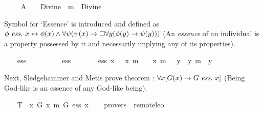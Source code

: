 \begin{isabellebody}
\begin{isamarkuptext}
\end{isamarkuptext}%
\isamarkuptrue%
\ \ \isamarkupfalse%
\ \ A{}{\isacharcolon}\ \ {\isachardoublequoteopen}{\isacharbrackleft}{\isasymPi}\ {\isacharparenleft}{\isasymlambda}{\isasymPhi}{\isachardot}\ Divine\ {\isasymPhi}\ m{\isasymRightarrow}\ {\isasymbox}\ {\isacharparenleft}Divine\ {\isasymPhi}{\isacharparenright}{\isacharparenright}{\isacharbrackright}{\isachardoublequoteclose}%
\begin{isamarkuptext}%
Symbol  for `Essence' is introduced and defined as 
$\phi \ \mathit{ess.} \ x \leftrightarrow \phi(x) \wedge \forall \psi (\psi(x) \rightarrow \Box \forall y (\phi(y) 
\rightarrow \psi(y)))$ (An \emph{essence} of an individual is a property possessed by it 
and necessarily implying any of its properties).%
\end{isamarkuptext}%
\isamarkuptrue%
\ \ \isamarkupfalse%
\ ess\ {\isacharcolon}{\isacharcolon}\ {\isachardoublequoteopen}{\isacharparenleft}{\isasymmu}\ {\isasymRightarrow}\ {\isasymsigma}{\isacharparenright}\ {\isasymRightarrow}\ {\isasymmu}\ {\isasymRightarrow}\ {\isasymsigma}{\isachardoublequoteclose}\ {\isacharparenleft}\ {\isachardoublequoteopen}ess{\isachardoublequoteclose}\ {}{}{\isacharparenright}\ \isanewline
\ \ \ \ {\isachardoublequoteopen}{\isasymPhi}\ ess\ x\ {\isacharequal}\ {\isasymPhi}\ x\ m{\isasymand}\ {\isasymPi}\ {\isacharparenleft}{\isasymlambda}{\isasympsi}{\isachardot}\ {\isasympsi}\ x\ m{\isasymRightarrow}\ {\isasymbox}\ {\isacharparenleft}{\isasymforall}\ {\isacharparenleft}{\isasymlambda}y{\isachardot}\ {\isasymPhi}\ y\ m{\isasymRightarrow}\ {\isasympsi}\ y{\isacharparenright}{\isacharparenright}{\isacharparenright}{\isachardoublequoteclose}%
\begin{isamarkuptext}%
Next, Sledgehammer and Metis prove theorem : $\forall x [G(x) \rightarrow G \ \mathit{ess.} \ x]$ 
(Being God-like is an essence of any God-like being).%
\end{isamarkuptext}%
\isamarkuptrue%
\ \ \isamarkupfalse%
\ T{}{\isacharcolon}\ {\isachardoublequoteopen}{\isacharbrackleft}{\isasymforall}\ {\isacharparenleft}{\isasymlambda}x{\isachardot}\ G\ x\ m{\isasymRightarrow}\ G\ ess\ x{\isacharparenright}{\isacharbrackright}{\isachardoublequoteclose}\isanewline
\ \ \isamarkupfalse%
\ {\isacharbrackleft}provers\ {\isacharequal}\ remote{\isacharunderscore}leo{}{\isacharbrackright}%
\isadelimproof
\ %

\end{isabellebody}
